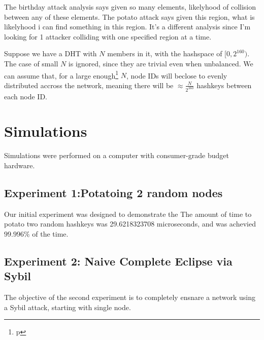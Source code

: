 \documentclass[10pt,a4paper]{article}
\begin{document}
The birthday attack analysis says given so many elements, likelyhood of collision between any of these elements.
The potato attack says given this region, what is likelyhood i can find something in this region.  
It's a different analysis since I'm looking for 1 attacker colliding with one specified region at a time.

Suppose we have a DHT with $N$ members in it, with the hashspace of $[0,2^{160})$.
The case of small $N$ is ignored, since they are trivial even when unbalanced.
We can assume that, for a large enough\footnote{p} $N$, node IDs will beclose to evenly distributed accross the network, meaning there will be $\approx \frac{N}{2^{160}}$ hashkeys between each node ID.


\section{Simulations}
Simulations were performed on a computer with consumer-grade budget hardware. 


\subsection{Experiment 1:Potatoing 2 random nodes}
Our initial experiment was designed to demonstrate the 
The amount of time to potato two random hashkeys was 29.6218323708 microseconds, and was achevied $ 99.996\%$ of the time.



\subsection{Experiment 2:  Naive Complete Eclipse via Sybil}
The objective of the second experiment is to completely ensnare a network using a Sybil attack, starting with single node.
\end{document}
